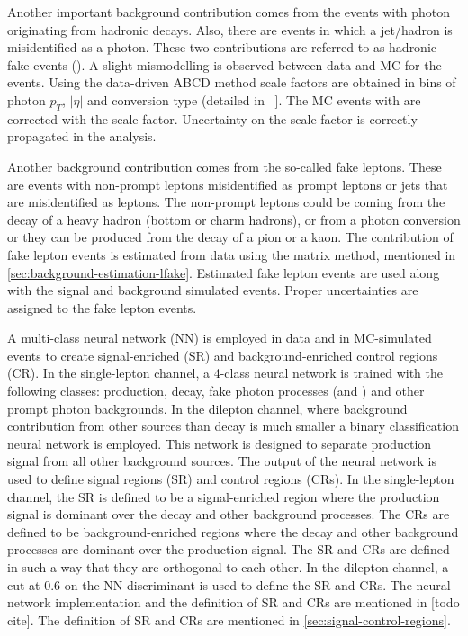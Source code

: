 Another important background contribution comes from the events with photon originating from hadronic decays. Also, there are events in which a jet/hadron is misidentified as a photon. These two contributions are referred to as hadronic fake events (\hfake). A slight mismodelling is observed between data and MC for the \hfake events. Using the data-driven ABCD method scale factors are obtained in bins of photon $p_T$, $|\eta|$ and conversion type (detailed in ~\cite{DiezPardos:2781712}]. The MC events with \hfake are corrected with the scale factor. Uncertainty on the scale factor is correctly propagated in the analysis.

Another background contribution comes from the so-called fake leptons. These are events with non-prompt leptons misidentified as prompt leptons or jets that are misidentified as leptons. The non-prompt leptons could be coming from the decay of a heavy hadron (bottom or charm hadrons), or from a photon conversion or they can be produced from the decay of a pion or a kaon. The contribution of fake lepton events is estimated from data using the matrix method, mentioned in \cref{sec:background-estimation-lfake}. Estimated fake lepton events are used along with the signal and background simulated events. Proper uncertainties are assigned to the fake lepton events.

A multi-class neural network (NN) is employed in data and in MC-simulated events to create signal-enriched (SR) and background-enriched control regions (CR). In the single-lepton channel, a 4-class neural network is trained with the following classes: \tty production, \tty decay, fake photon processes (\efake and \hfake) and other prompt photon backgrounds. In the dilepton channel, where background contribution from other sources than \tty decay is much smaller a binary classification neural network is employed. This network is designed to separate \tty production signal from all other background sources. The output of the neural network is used to define signal regions (SR) and control regions (CRs). In the single-lepton channel, the SR is defined to be a signal-enriched region where the \tty production signal is dominant over the \tty decay and other background processes. The CRs are defined to be background-enriched regions where the \tty decay and other background processes are dominant over the \tty production signal. The SR and CRs are defined in such a way that they are orthogonal to each other. In the dilepton channel, a cut at 0.6 on the NN discriminant is used to define the SR and CRs. The neural network implementation and the definition of SR and CRs are mentioned in [todo cite].
The definition of SR and CRs are mentioned in \cref{sec:signal-control-regions}. 

